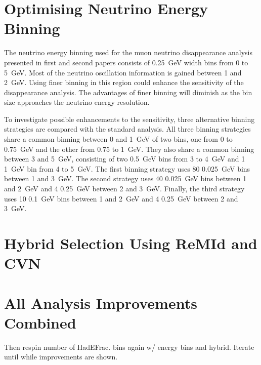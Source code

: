 






\section{Optimising Neutrino Energy Binning}

The neutrino energy binning used for the muon neutrino
disappearance analysis presented in first and second papers consists
of 0.25~GeV width bins from 0 to 5~GeV. 
Most of the neutrino oscillation information is gained between 1 and
2~GeV.
Using finer binning in this region could enhance the sensitivity of
the disappearance analysis. 
The advantages of finer binning will diminish as the bin size
approaches the neutrino energy resolution.

To investigate possible enhancements to the sensitivity, three
alternative binning strategies are compared with the standard
analysis. 
All three binning strategies share a common binning between 0 and
1~GeV of two bins, one from 0 to 0.75~GeV and the other from 0.75 to
1~GeV. 
They also share a common binning between 3 and 5~GeV,
consisting of two 0.5~GeV bins from 3 to 4~GeV and 1 1~GeV bin from 4
to 5~GeV.
The first binning strategy uses 80 0.025~GeV bins between 1 and
3~GeV. 
The second strategy uses 40 0.025~GeV bins between 1 and 2~GeV and 4
0.25~GeV between 2 and 3~GeV. 
Finally, the third strategy uses 10 0.1~GeV bins between 1 and 2~GeV
and 4 0.25~GeV between 2 and 3~GeV.


\section{Hybrid Selection Using ReMId and CVN}


\section{All Analysis Improvements Combined}

Then respin number of HadEFrac. bins again w/ energy bins and
hybrid. Iterate until while improvements are shown.  


